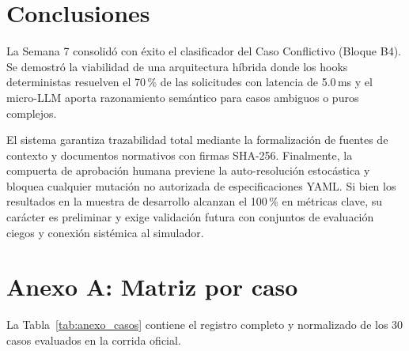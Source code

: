 \documentclass[11pt,a4paper]{article}
\begin{document}
\section{Conclusiones}
La Semana 7 consolidó con éxito el clasificador del Caso Conflictivo (Bloque B4). Se demostró la viabilidad de una arquitectura híbrida donde los hooks deterministas resuelven el 70\,\% de las solicitudes con latencia de 5.0\,ms y el micro-LLM aporta razonamiento semántico para casos ambiguos o puros complejos.

El sistema garantiza trazabilidad total mediante la formalización de fuentes de contexto y documentos normativos con firmas SHA-256. Finalmente, la compuerta de aprobación humana previene la auto-resolución estocástica y bloquea cualquier mutación no autorizada de especificaciones YAML. Si bien los resultados en la muestra de desarrollo alcanzan el 100\,\% en métricas clave, su carácter es preliminar y exige validación futura con conjuntos de evaluación ciegos y conexión sistémica al simulador.

\section{Anexo A: Matriz por caso}
La Tabla~\ref{tab:anexo_casos} contiene el registro completo y normalizado de los 30 casos evaluados en la corrida oficial.
\end{document}
